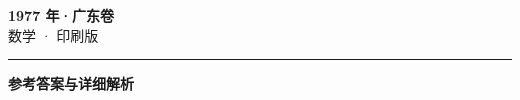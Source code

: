 \documentclass[zihao=5, a4paper]{ctexart}
\begin{document}
\begin{center}
  {\Large\bfseries 1977 年·广东卷}\\[4pt]
  {\large 数学 · 印刷版}
\end{center}
\medskip
{}

\par\bigskip\hrule\bigskip
{}
\begin{center}{\large\bfseries 参考答案与详细解析}\end{center}
\smallskip

\end{document}
